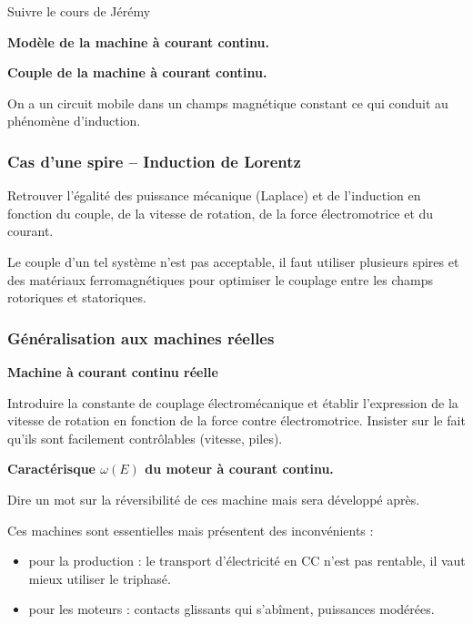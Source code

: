 Suivre le cours de Jérémy

\begin{slide}
\textbf{Modèle de la machine à courant continu.}
\end{slide}

\begin{slide}
\textbf{Couple de la machine à courant continu.}
\end{slide}

\begin{transition}
On a un circuit mobile dans un champs magnétique constant ce qui conduit au phénomène d'induction.
\end{transition}

\subsubsection{Cas d'une spire -- Induction de Lorentz}

Retrouver l'égalité des puissance mécanique (Laplace) et de l'induction en fonction du couple, de la vitesse de rotation, de la force électromotrice et du courant.

\begin{transition}
Le couple d'un tel système n'est pas acceptable, il faut utiliser plusieurs spires et des matériaux ferromagnétiques pour optimiser le couplage entre les champs rotoriques et statoriques.
\end{transition}


\subsubsection{Généralisation aux machines réelles}

\begin{slide}
\textbf{Machine à courant continu réelle}
\end{slide}

Introduire la constante de couplage électromécanique et établir l'expression de la vitesse de rotation en fonction de la force contre électromotrice.
Insister sur le fait qu'ils sont facilement contrôlables (vitesse, piles).

\begin{experience}
\textbf{Caractérisque $\omega(E)$ du moteur à courant continu.}
\end{experience}

Dire un mot sur la réversibilité de ces machine mais sera développé après.

\begin{transition}
Ces machines sont essentielles mais présentent des inconvénients :
\begin{itemize}
\item pour la production : le transport d'électricité en CC n'est pas rentable, il vaut mieux utiliser le triphasé.
\item pour les moteurs : contacts glissants qui s'abîment, puissances modérées. 
\end{itemize}
\end{transition}

